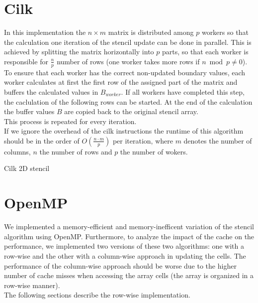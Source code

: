 \documentclass[11pt,a4paper]{article}
\begin{document}
\section{Cilk}
In this implementation the $n\times m$ matrix is distributed among $p$ workers so that the calculation one iteration of the stencil update can be done in parallel. This is achieved by splitting the matrix horizontally into $p$ parts, so that each worker is responsible for $\frac{n}{p}$ number of rows (one worker takes more rows if $n \bmod p \neq 0$).\\
To ensure that each worker has the correct non-updated boundary values, each worker calculates at first the first row of the assigned part of the matrix and buffers the calculated values in $B_{worker}$. If all workers have completed this step, the caclulation of the following rows can be started. At the end of the calculation the buffer values $B$ are copied back to the original stencil array.\\
This process is repeated for every iteration.\\
If we ignore the overhead of the cilk instructions the runtime of this algorithm should be in the order of $O(\frac{n \cdot m}{p})$ per iteration, where $m$ denotes the number of columns, $n$ the number of rows and $p$ the number of wokers.

\begin{algorithm}[H] \label{algo:cilk}
 \caption{Cilk 2D stencil}
\end{algorithm}


\section{OpenMP}
We implemented a memory-efficient and memory-inefficent variation of the stencil algorithm using OpenMP.
Furthermore, to analyze the impact of the cache on the performance, we implemented two versions of these two algorithms: one with a row-wise and the other with a column-wise approach in updating the cells. The performance of the column-wise approach should be worse due to the higher number of cache misses when accessing the array cells (the array is organized in a row-wise manner).\\
The following sections describe the row-wise implementation.
\end{document}
